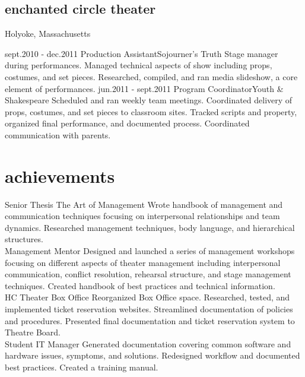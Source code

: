 \documentclass[]{friggeri-cv} %
\begin{document}

\subsection
{enchanted circle theater}
{Holyoke, Massachusetts}

\begin{entrylist}
\entry
{sept.2010 - dec.2011}
{Production Assistant}{Sojourner's Truth}
{Stage manager during performances. Managed technical aspects of show including props, costumes, and set pieces. Researched, compiled, and ran media slideshow, a core element of performances.}
\entry
{jun.2011 - sept.2011}
{Program Coordinator}{Youth \& Shakespeare}
{Scheduled and ran weekly team meetings. Coordinated delivery of props, costumes, and set pieces to classroom sites. Tracked scripts and property, organized final performance, and documented process. Coordinated communication with parents.}
\end{entrylist}


\section{achievements}

\begin{entrylist}
\entry
{Senior Thesis}
{The Art of Management}{}
{Wrote handbook of management and communication techniques focusing on interpersonal relationships and team dynamics. Researched management techniques, body language, and hierarchical structures.\\}
\entry
{Management Mentor}{}{}
{Designed and launched a series of management workshops focusing on different aspects of theater management including interpersonal communication, conflict resolution, rehearsal structure, and stage management techniques. Created handbook of best practices and technical information.\\}
\entry
{HC Theater Box Office}{}{}
{Reorganized Box Office space. Researched, tested, and implemented ticket reservation websites. Streamlined documentation of policies and procedures. Presented final documentation and ticket reservation system to Theatre Board.\\}
\entry
{Student IT Manager}{}{}
{Generated documentation covering common software and hardware issues, symptoms, and solutions. Redesigned workflow and documented best practices. Created a training manual.\\}
\end{entrylist}
\end{document}
